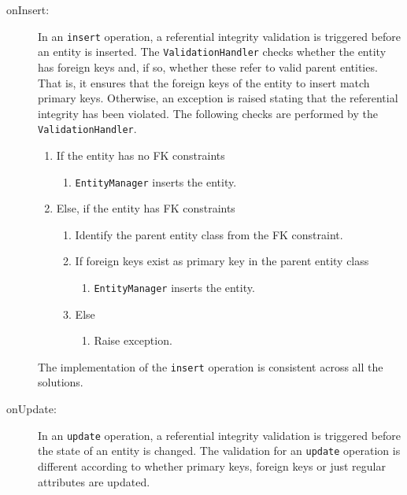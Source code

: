 	\begin{description}
	\item[onInsert:]
		In an \texttt{insert} operation,  a referential integrity validation is
		triggered before an entity is  inserted. The \texttt{ValidationHandler}  checks
		whether the entity has foreign keys and, if so, whether these refer to valid
		parent entities. That is,  it ensures that the foreign keys of the entity to
		insert match primary keys.  Otherwise, an exception is raised stating that the
		referential integrity has been violated. The following checks are performed by
		the \texttt{ValidationHandler}.
		
		\renewcommand{\labelenumii}{\arabic{enumi}. \arabic{enumii}}
		\renewcommand{\labelenumiii}{\arabic{enumi}. \arabic{enumii}. \arabic{enumiii}}
		
		\begin{enumerate}
		\item If the entity has no \ac{FK} constraints
				\begin{enumerate}
		  		\item \texttt{EntityManager} inserts the entity. 
		  		\end{enumerate}
				
		\item Else,  if the entity has \ac{FK} constraints 
		  		\begin{enumerate}
				\item Identify the parent entity class from the \ac{FK} constraint. 
				\item If foreign keys exist as  primary key in the parent entity class
				  		\begin{enumerate}
				  		\item \texttt{EntityManager} inserts the entity. 
				  		\end{enumerate}
				\item Else
				   		\begin{enumerate}
				   		  \item Raise exception. 
				   		\end{enumerate}
				\end{enumerate}   	
		\end{enumerate}
		The implementation of the \texttt{insert} operation is consistent across all the
		solutions.  
		
	\item[onUpdate:] 
		In an \texttt{update} operation,  a referential integrity validation is
		triggered before the state of an entity is changed.  The validation for an
		\texttt{update} operation is different according to whether primary keys,
		foreign keys or just regular attributes are updated.
		

\end{description}
